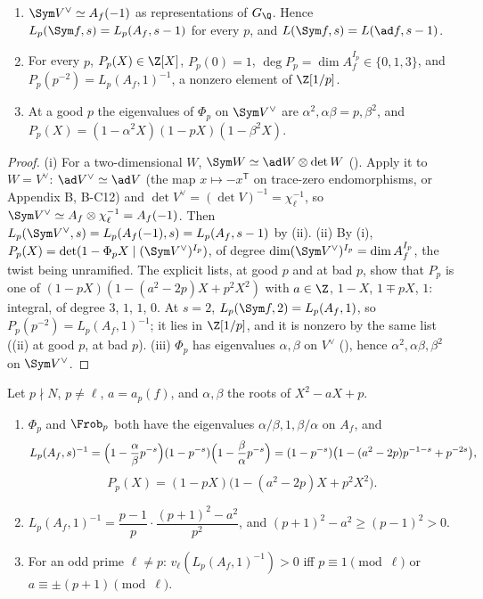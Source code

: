 \begin{proposition}\label{prop:lfunctions:ad-sym}
\begin{enumerate}[label=(\roman*)]
\item $\Sym V^\vee\simeq A_f(-1)$ as representations of $G_\Q$. Hence $L_p(\Sym f,s)=L_p(A_f,s-1)$ for every $p$, and $L(\Sym f,s)=L(\ad f,s-1)$.
\item For every $p$, $P_p(X)\in\Z[X]$, $P_p(0)=1$, $\deg P_p=\dim A_f^{I_p}\in\{0,1,3\}$, and $P_p(p^{-2})=L_p(A_f,1)^{-1}$, a nonzero element of $\Z[1/p]$.
\item At a good $p$ the eigenvalues of $\Phi_p$ on $\Sym V^\vee$ are $\alpha^2,\alpha\beta=p,\beta^2$, and $P_p(X)=(1-\alpha^2X)(1-pX)(1-\beta^2X)$.
\end{enumerate}
\end{proposition}

\begin{proof}
(i) For a two-dimensional $W$, $\Sym W\simeq\ad W\otimes\det W$ (). Apply it to $W=V^\vee$: $\ad V^\vee\simeq\ad V$ (the map $x\mapsto-x^{\mathsf T}$ on
trace-zero endomorphisms, or Appendix B, B-C12) and $\det V^\vee=(\det V)^{-1}=\chi_\ell^{-1}$, so $\Sym V^\vee\simeq A_f\otimes\chi_\ell^{-1}=A_f(-1)$. Then
$L_p(\Sym V^\vee,s)=L_p(A_f(-1),s)=L_p(A_f,s-1)$ by (ii). (ii) By (i), $P_p(X)=\det(1-\Phi_pX\mid(\Sym V^\vee)^{I_p})$, of degree
$\dim(\Sym V^\vee)^{I_p}=\dim A_f^{I_p}$, the twist being unramified. The explicit lists,  at good $p$ and  at bad
$p$, show that $P_p$ is one of $(1-pX)(1-(a^2-2p)X+p^2X^2)$ with $a\in\Z$, $1-X$, $1\mp pX$, $1$: integral, of degree $3$, $1$, $1$, $0$. At $s=2$,
$L_p(\Sym f,2)=L_p(A_f,1)$, so $P_p(p^{-2})=L_p(A_f,1)^{-1}$; it lies in $\Z[1/p]$, and it is nonzero by the same list ((ii) at good $p$,  at bad $p$). (iii) $\Phi_p$ has
eigenvalues $\alpha,\beta$ on $V^\vee$ (), hence $\alpha^2,\alpha\beta,\beta^2$ on $\Sym V^\vee$.
\end{proof}

\begin{proposition}\label{prop:lfunctions:good-factor}
Let $p\nmid N$, $p\ne\ell$, $a=a_p(f)$, and $\alpha,\beta$ the roots of $X^2-aX+p$.
\begin{enumerate}[label=(\roman*)]
\item $\Phi_p$ and $\Frob_p$ both have the eigenvalues $\alpha/\beta,1,\beta/\alpha$ on $A_f$, and
\[
L_p(A_f,s)^{-1}=\Bigl(1-\frac\alpha\beta p^{-s}\Bigr)(1-p^{-s})\Bigl(1-\frac\beta\alpha p^{-s}\Bigr)=(1-p^{-s})\bigl(1-(a^2-2p)p^{-1-s}+p^{-2s}\bigr),
\]
\[
P_p(X)=(1-pX)\bigl(1-(a^2-2p)X+p^2X^2\bigr).
\]
\item $L_p(A_f,1)^{-1}=\dfrac{p-1}p\cdot\dfrac{(p+1)^2-a^2}{p^2}$, and $(p+1)^2-a^2\ge(p-1)^2>0$.
\item For an odd prime $\ell\ne p$: $v_\ell(L_p(A_f,1)^{-1})>0$ iff $p\equiv1\pmod\ell$ or $a\equiv\pm(p+1)\pmod\ell$.
\end{enumerate}
\end{proposition}

